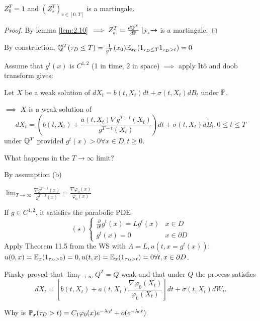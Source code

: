 \begin{lemma}\label{lem:2.11}
    $Z_0^T=1$ and $(Z_s^T)_{s\in [0,T]}$ is a martingale.
\end{lemma}

\begin{proof}
    By lemma \ref{lem:2.10} $\implies Z_s^T=\frac{d\mathbb{Q}^T}{d\mathbb{P}}\mid_{\mathcal{F}_s}\to$ is a martingale.
\end{proof}

\begin{remark}
    By construction, $\mathbb{Q}^T(\tau_D\leq T)=\frac{1}{g^T}(x_0)\mathbb{E}_{x_0}(1_{\tau_D\leq T}1_{\tau_D>t})=0$
\end{remark}

Assume that $g^t(x)$ is $C^{1,2}$ (1 in time, 2 in space) $\implies$ apply Itô and 
doob transform gives:

\begin{proposition}\label{prop:2.12}
    Let $X$ be a weak solution of $dX_t=b(t,X_t)dt+\sigma(t,X_t)dB_t$ under $\mathbb{P}$.

    $\implies$ $X$ is a weak solution of 
    \[dX_t=\left(b(t,X_t)+\frac{a(t,X_t) \nabla g^{T-t}(X_t)}{g^{T-t}(X_t)}\right)dt +\sigma(t,X_t)d\tilde{B}_t, 0\leq t\leq T\]
    under $\mathbb{Q}^T$ provided $g^t(x)>0\forall x\in D,t\geq 0$.
\end{proposition}

What happens in the $T\to\infty$ limit?

By assumption (b)

$\lim_{T\to\infty}\frac{\nabla g^{T-t}(x)}{g^{T-t}(x)}=\frac{\nabla \varphi_0(x)}{\varphi_0(x)}$

\begin{remark}
    If $g\in C^{1,2}$, it satisfies the parabolic PDE 
    \[(\star)\begin{cases}\frac{\partial}{\partial t}g^t(x)=L g^t(x) & x\in D\\ g^t(x)=0 & x\in\partial D\end{cases}\]
    Apply Theorem 11.5 from the WS with $A=L,u(t,x=g^t(x))$: 
    $u(0,x)=\mathbb{E}_x(1_{\tau_D>0})=0,u(t,x)=\mathbb{E}_x(1_{\tau_D>t})=0\forall t,x\in\partial D$.
\end{remark}

Pinsky proved that $\lim_{T\to\infty} Q^T=Q$ weak and that under $Q$ the process satisfies
\[dX_t = \left[b(t,X_t)+a(t,X_t)\frac{\nabla \varphi_0(X_t)}{\varphi_0(X_t)} \right]dt +\sigma(t,X_t)dW_t.\]


Why is $\mathbb{P}_x(\tau_D>t)=C_1\varphi_0(x)e^{-\lambda_0 t}+o(e^{-\lambda_0t})$

